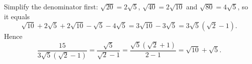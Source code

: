 Simplify the denominator first: $\sqrt{20}=2\sqrt5$, $\sqrt{40}=2\sqrt{10}$ and $\sqrt{80}=4\sqrt5$, so it equals
\[
\sqrt{10}+2\sqrt5+2\sqrt{10}-\sqrt5-4\sqrt5=3\sqrt{10}-3\sqrt5=3\sqrt5\left(\sqrt2-1\right).
\]
Hence
\[
\dfrac{15}{3\sqrt5\left(\sqrt2-1\right)}=\dfrac{\sqrt5}{\sqrt2-1}=\dfrac{\sqrt5\left(\sqrt2+1\right)}{2-1}=\boxed{\sqrt{10}+\sqrt5}.
\]
